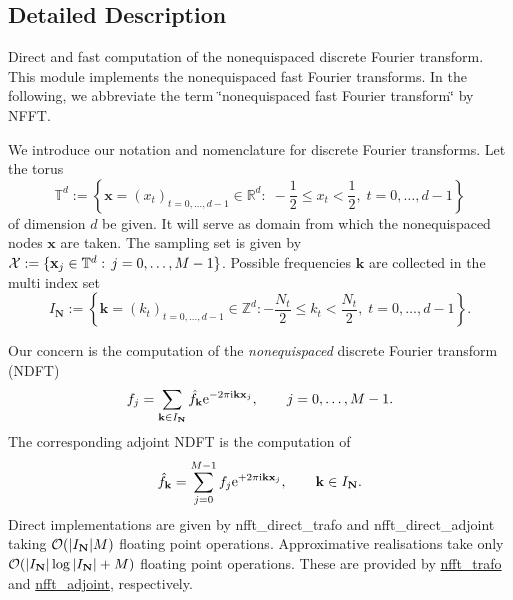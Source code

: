 \subsection{Detailed Description}
Direct and fast computation of the nonequispaced discrete Fourier transform. This module implements the nonequispaced fast Fourier transforms. In the following, we abbreviate the term \char`\"{}nonequispaced fast Fourier
transform\char`\"{} by N\-F\-F\-T.

We introduce our notation and nomenclature for discrete Fourier transforms. Let the torus \[ \mathbb{T}^d := \left\{ \mathbf{x}=\left(x_t\right)_{t=0,\dots,d-1}\in\mathbb{R}^{d}: \; - \frac{1}{2} \le x_t < \frac{1}{2},\; t=0,\dots,d-1 \right\} \] of dimension $d$ be given. It will serve as domain from which the nonequispaced nodes $\mathbf{x}$ are taken. The sampling set is given by ${\cal X}:=\{\mathbf{x}_j \in {\mathbb T}^d: \,j=0,\dots,M-1\}$. Possible frequencies $\mathbf{k}$ are collected in the multi index set \[ I_{\mathbf{N}} := \left\{ \mathbf{k}=\left(k_t\right)_{t=0,\dots,d-1}\in \mathbb{Z}^d: - \frac{N_t}{2} \le k_t < \frac{N_t}{2} ,\;t=0,\dots,d-1 \right\}. \]

Our concern is the computation of the {\itshape nonequispaced} discrete Fourier transform {\itshape }(N\-D\-F\-T)\label{group__nfft_ndft_formula}%
\hypertarget{group__nfft_ndft_formula}{}%
 \[ f_j = \sum_{\mathbf{k}\in I_{\mathbf{N}}} \hat{f}_{\mathbf{k}} {\rm e}^{-2\pi{\rm i} \mathbf{k}\mathbf{x}_j}, \qquad j=0,\dots,M-1. \] The corresponding adjoint N\-D\-F\-T is the computation of \[ \hat f_{\mathbf{k}}=\sum_{j=0}^{M-1} f_j {\rm e}^{+2\pi{\rm i} \mathbf{k}\mathbf{x}_j}, \qquad \mathbf{k}\in I_{\mathbf{N}}. \] Direct implementations are given by nfft\-\_\-direct\-\_\-trafo and nfft\-\_\-direct\-\_\-adjoint taking ${\cal O}(|I_{\mathbf{N}}|M)$ floating point operations. Approximative realisations take only ${\cal O}(|I_{\mathbf{N}}|\log|I_{\mathbf{N}}|+M)$ floating point operations. These are provided by \hyperlink{group__nfft_ga9f1e6bd9f7f956a8679e6b413c97b421}{nfft\-\_\-trafo} and \hyperlink{group__nfft_ga4b44c1dd52026dcb494dc735f0fa5b08}{nfft\-\_\-adjoint}, respectively. 

